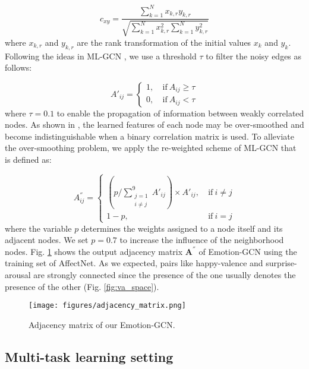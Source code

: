 \documentclass[a4paper, 10pt, conference]{ieeeconf}      \usepackage{FG2021}
\begin{document}
\begin{equation}
    c_{xy} = \frac{\sum_{k=1}^N x_{k,r} y_{k,r}}{\sqrt{\sum_{k=1}^N x_{k,r}^2 \sum_{k=1}^N y_{k,r}^2}}
\end{equation}
where $x_{k, r}$ and $y_{k, r}$ are the rank transformation of the initial values $x_k$ and $y_k$. Following the ideas in ML-GCN \cite{chen2019multi}, we use a threshold $\tau$ to filter the noisy edges as follows:

\begin{equation}
    A'_{ij} = \begin{cases}
    1, &\ \text{if} \ A_{ij} \geq \tau \\
    0, &\ \text{if} \ A_{ij} < \tau
    \end{cases}
\end{equation}
where $\tau=0.1$ to enable the propagation of information between weakly correlated nodes. As shown in \cite{li2018deeper}, the learned features of each node may be over-smoothed and become indistinguishable when a binary correlation matrix is used. To alleviate the over-smoothing problem, we apply the re-weighted scheme of ML-GCN that is defined as: 

\begin{equation}
    A^{''}_{ij} = \begin{cases}
    (p/\sum_{\substack{j=1 \\ i \neq j}}^{9} A'_{ij}) \times A'_{ij}, &\ \text{if} \ i \neq j \\
    1-p, &\ \text{if} \ i = j
    \end{cases}
    \label{eqn:adj_type}
\end{equation}
where the variable $p$ determines the weights assigned to a node itself and its adjacent nodes. We set $p = 0.7$ to increase the influence of the neighborhood nodes. Fig. \ref{fig:adj_matrix} shows the output adjacency matrix $\mathbf{A^{''}}$ of Emotion-GCN using the training set of AffectNet. As we expected, pairs like happy-valence and surprise-arousal are strongly connected since the presence of the one usually denotes the presence of the other (Fig. \ref{fig:va_space}).

\begin{figure}[t]
    \centering
    \texttt{[image: figures/adjacency\_matrix.png]}
    \caption{Adjacency matrix of our Emotion-GCN.}
    \label{fig:adj_matrix}
\end{figure}

\subsection{Multi-task learning setting}
\end{document}
